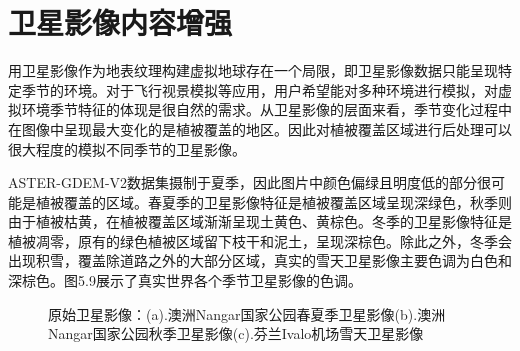 \section{卫星影像内容增强}
用卫星影像作为地表纹理构建虚拟地球存在一个局限，即卫星影像数据只能呈现特定季节的环境。对于飞行视景模拟等应用，用户希望能对多种环境进行模拟，对虚拟环境季节特征的体现是很自然的需求。从卫星影像的层面来看，季节变化过程中在图像中呈现最大变化的是植被覆盖的地区。因此对植被覆盖区域进行后处理可以很大程度的模拟不同季节的卫星影像。\par
ASTER-GDEM-V2数据集摄制于夏季，因此图片中颜色偏绿且明度低的部分很可能是植被覆盖的区域。春夏季的卫星影像特征是植被覆盖区域呈现深绿色，秋季则由于植被枯黄，在植被覆盖区域渐渐呈现土黄色、黄棕色。冬季的卫星影像特征是植被凋零，原有的绿色植被区域留下枝干和泥土，呈现深棕色。除此之外，冬季会出现积雪，覆盖除道路之外的大部分区域，真实的雪天卫星影像主要色调为白色和深棕色。图5.9展示了真实世界各个季节卫星影像的色调。
\begin{figure}[!h]
    \centering
   
    \caption{原始卫星影像：(a).澳洲Nangar国家公园春夏季卫星影像\supercite{nangar}(b).澳洲Nangar国家公园秋季卫星影像\supercite{nangar}(c).芬兰Ivalo机场雪天卫星影像\supercite{thaws}}
\end{figure}

